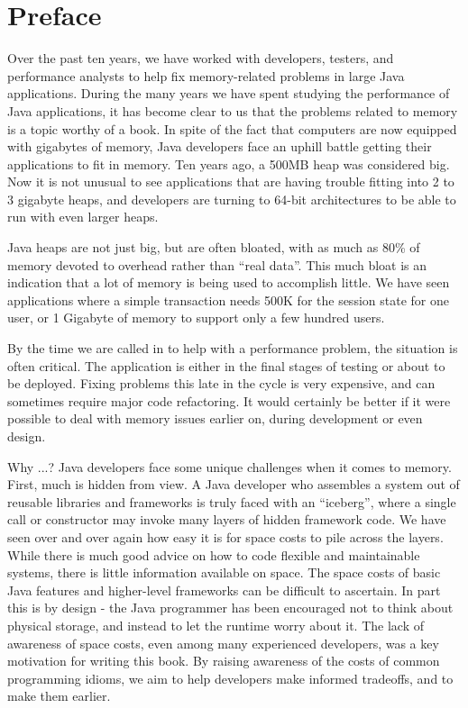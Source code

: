 \chapter{Preface}

Over the past ten years, we have worked with developers, testers, and performance analysts to help fix memory-related problems in large Java applications.  During the many years we have spent studying the performance of Java applications, it has become clear to us that the problems related to memory is a topic worthy of a book. 
In spite of the fact that computers are now equipped with gigabytes of memory, Java developers face an uphill battle getting their applications to fit in memory. Ten years ago, a 500MB heap was considered big. Now it is not unusual to see applications that are having trouble fitting into 2 to 3 gigabyte heaps, and developers are turning to 64-bit architectures to be able to run with even larger heaps.  

Java heaps are not just big, but are often bloated, with as much as 80\% of memory devoted to overhead rather than "`real data"'. This much bloat is an indication that a lot of memory is being used to accomplish little. We have seen applications where a simple transaction needs 500K for the session state for one user, or 1 Gigabyte of memory to support only a few hundred users. 

By the time we are called in to help with a performance problem, the situation is often critical. The application is either in the final stages of testing or about to be deployed. Fixing problems this late in the cycle is very expensive, and can sometimes require major code refactoring. It would certainly be better if it were possible to deal with memory issues earlier on, during development or even design.

Why ...? Java developers face some unique challenges when it comes to memory. First, much is hidden from view. A Java developer who assembles a system out of reusable libraries and frameworks is truly faced with an "`iceberg"', where a single call or constructor may invoke many layers of hidden framework code. We have seen over and over again how easy it is for space costs to pile across the layers. %
While there is much good advice on how to code flexible and maintainable systems, there is little information available on space. The space costs of basic Java features and higher-level frameworks can be difficult to ascertain. In part this is by design - the Java programmer has been encouraged not to think about physical storage, and instead to let the runtime worry about it. The lack of awareness of space costs, even among many experienced developers, was a key motivation for writing this book. By raising awareness of the costs of common programming idioms, we aim to help developers make informed tradeoffs, and to make them earlier.

